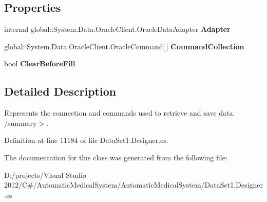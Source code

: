 \subsection*{Properties}
\begin{CompactItemize}
\item 
internal global::System.Data.OracleClient.OracleDataAdapter \textbf{Adapter}\hspace{0.3cm}{\tt  [get]}\label{class_automatic_medical_system_1_1_data_set1_table_adapters_1_1_d_o_c_t_o_r_s_table_adapter_c550f89c5b6dbe9dc3cc53e1c395eeac}

\item 
global::System.Data.OracleClient.OracleCommand[$\,$] \textbf{CommandCollection}\hspace{0.3cm}{\tt  [get]}\label{class_automatic_medical_system_1_1_data_set1_table_adapters_1_1_d_o_c_t_o_r_s_table_adapter_d116e14647ae70c3364451913e063959}

\item 
bool \textbf{ClearBeforeFill}\hspace{0.3cm}{\tt  [get, set]}\label{class_automatic_medical_system_1_1_data_set1_table_adapters_1_1_d_o_c_t_o_r_s_table_adapter_4045133664f18ba0bc3cbe556703b986}

\end{CompactItemize}


\subsection{Detailed Description}
Represents the connection and commands used to retrieve and save data. /summary$>$. 

Definition at line 11184 of file DataSet1.Designer.cs.

The documentation for this class was generated from the following file:\begin{CompactItemize}
\item 
D:/projects/Visual Studio 2012/C\#/AutomaticMedicalSystem/AutomaticMedicalSystem/DataSet1.Designer.cs\end{CompactItemize}
